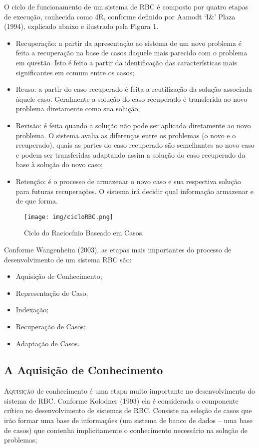 O ciclo de funcionamento de um sistema de RBC é composto por quatro etapas de execução, conhecida como 4R, conforme definido por Aamodt `I\&'  Plaza (1994), explicado abaixo e ilustrado pela Figura 1.
\begin{itemize}
    \item Recuperação: a partir da apresentação ao sistema de um novo problema é feita a recuperação na base de casos daquele mais parecido com o problema em questão. Isto é feito a partir da identificação das características mais significantes em comum entre os casos;
    \item Reuso: a partir do caso recuperado é feita a reutilização da solução associada àquele caso. Geralmente a solução do caso recuperado é transferida ao novo problema diretamente como sua solução;
    \item Revisão: é feita quando a solução não pode ser aplicada diretamente ao novo problema. O sistema avalia as diferenças entre os problemas (o novo e o recuperado), quais as partes do caso recuperado são semelhantes ao novo caso e podem ser transferidas adaptando assim a solução do caso recuperado da base à solução do novo caso;
    \item Retenção: é o processo de armazenar o novo caso e sua respectiva solução para futuras recuperações. O sistema irá decidir qual informação armazenar e de que forma.
\end{itemize}

\begin{figure}[htbp!]
\centering
\texttt{[image: img/cicloRBC.png]}
\caption{Ciclo do Raciocínio Baseado em Casos.}
\label{fig:cicloRBC}
\end{figure}

Conforme Wangenheim (2003), as etapas mais importantes do processo de
desenvolvimento de um sistema RBC são:
\begin{itemize}
    \item Aquisição de Conhecimento;
    \item Representação de Caso;
    \item Indexação;
    \item Recuperação de Casos;
    \item Adaptação de Casos.
\end{itemize}

\subsection{A Aquisição de Conhecimento}
\lettrine{A}{quisição} de conhecimento é uma etapa muito importante no desenvolvimento do sistema de RBC. Conforme Kolodner (1993) ela é considerada o componente crítico no desenvolvimento de sistemas de RBC. Consiste na seleção de casos que irão formar uma base de informações (um sistema de banco de dados – uma base de casos) que contenha implicitamente o conhecimento necessário na solução de problemas;

